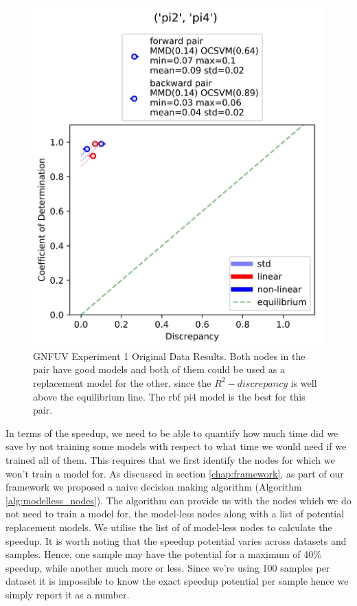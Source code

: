 \documentclass{mpaper}
\begin{document}
\begin{figure}
    \begin{center}
        \includegraphics[scale = 0.085]{experiment_1.jpg}
    \end{center}
    \caption{GNFUV Experiment 1 Original Data Results. Both nodes in the pair have good models and both of them could be used as a replacement model for the other, since the $R^2 - discrepancy$ is well above the equilibrium line. The rbf pi4 model is the best for this pair.}
    \label{fig:gnfuv_exp1}
\end{figure}

In terms of the speedup, we need to be able to quantify how much time did we save by not training some models with respect to what time we would need if we trained all of them. This requires that we first identify the nodes for which we won't train a model for. As discussed in section \ref{chap:framework}, as part of our framework we proposed a naive decision making algorithm (Algorithm \ref{alg:modelless_nodes}). The algorithm can provide us with the nodes which we do not need to train a model for, the model-less nodes along with a list of potential replacement models. We utilise the list of of model-less nodes to calculate the speedup. It is worth noting that the speedup potential varies across datasets and samples. Hence, one sample may have the potential for a maximum of 40\% speedup, while another much more or less. Since we're using 100 samples per dataset it is impossible to know the exact speedup potential per sample hence we simply report it as a number.
\end{document}
